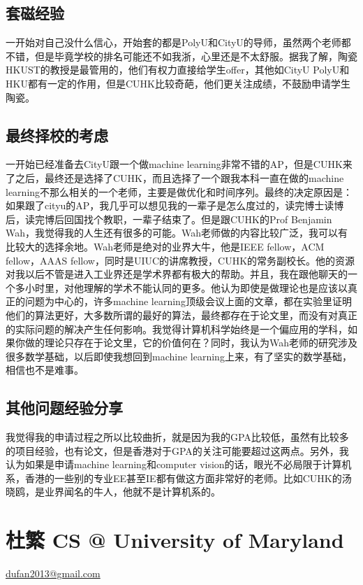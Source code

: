 \documentclass[11pt,fleqn,openany]{book} %
\begin{document}
\subsection*{套磁经验}
一开始对自己没什么信心，开始套的都是PolyU和CityU的导师，虽然两个老师都不错，但是毕竟学校的排名可能还不如我浙，心里还是不太舒服。据我了解，陶瓷HKUST的教授是最管用的，他们有权力直接给学生offer，其他如CityU PolyU和HKU都有一定的作用，但是CUHK比较奇葩，他们更关注成绩，不鼓励申请学生陶瓷。
\subsection*{最终择校的考虑}
一开始已经准备去CityU跟一个做machine learning非常不错的AP，但是CUHK来了之后，最终还是选择了CUHK，而且选择了一个跟我本科一直在做的machine learning不那么相关的一个老师，主要是做优化和时间序列。最终的决定原因是：如果跟了cityu的AP，我几乎可以想见我的一辈子是怎么度过的，读完博士读博后，读完博后回国找个教职，一辈子结束了。但是跟CUHK的Prof Benjamin Wah，我觉得我的人生还有很多的可能。Wah老师做的内容比较广泛，我可以有比较大的选择余地。Wah老师是绝对的业界大牛，他是IEEE fellow，ACM fellow，AAAS fellow，同时是UIUC的讲席教授，CUHK的常务副校长。他的资源对我以后不管是进入工业界还是学术界都有极大的帮助。并且，我在跟他聊天的一个多小时里，对他理解的学术不能认同的更多。他认为即使是做理论也是应该以真正的问题为中心的，许多machine learning顶级会议上面的文章，都在实验里证明他们的算法更好，大多数所谓的最好的算法，最终都存在于论文里，而没有对真正的实际问题的解决产生任何影响。我觉得计算机科学始终是一个偏应用的学科，如果你做的理论只存在于论文里，它的价值何在？同时，我认为Wah老师的研究涉及很多数学基础，以后即使我想回到machine learning上来，有了坚实的数学基础，相信也不是难事。
\subsection*{其他问题经验分享}
我觉得我的申请过程之所以比较曲折，就是因为我的GPA比较低，虽然有比较多的项目经验，也有论文，但是香港对于GPA的关注可能要超过这两点。另外，我认为如果是申请machine learning和computer vision的话，眼光不必局限于计算机系，香港的一些别的专业EE甚至IE都有做这方面非常好的老师。比如CUHK的汤晓鸥，是业界闻名的牛人，他就不是计算机系的。
\clearpage
\section{杜繁 CS @ University of Maryland}
\hfill \href{mailto:dufan2013@gmail.com}{dufan2013@gmail.com}
\end{document}
